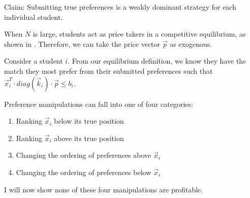 \documentclass{article}
\begin{document}
Claim: Submitting true preferences is a weakly dominant strategy for each individual student.

When $N$ is large, students act as price takers in a competitive equilibrium, as shown in \textcite{budish2011}. Therefore, we can take the price vector $\vec{p}$ as exogenous. 

Consider a student $i$. From our equilibrium definition, we know they have the match they most prefer from their submitted preferences such that $\vec{x}_i^T \cdot diag(\vec{k}_i) \cdot \vec{p} \leq b_i$.

Preference manipulations can fall into one of four categories:

\begin{enumerate}
    \item Ranking $\vec{x}_i$ below its true position
    
    \item Ranking $\vec{x}_i$ above its true position
    
    \item Changing the ordering of preferences above $\vec{x}_i$
    
    \item Changing the ordering of preferences below $\vec{x}_i$
\end{enumerate}

I will now show none of these four manipulations are profitable.
\end{document}
